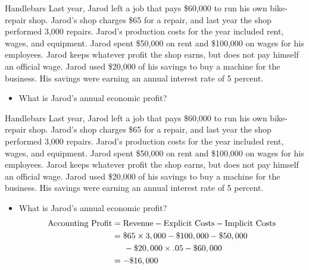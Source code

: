 \documentclass{beamer}
\begin{document}
\begin{frame}[t]{Handlebars}
    Last year, Jarod left a job that pays \$60,000 to run his own bike-repair shop. Jarod’s shop charges \$65 for a repair, and last year the shop performed 3,000 repairs. Jarod’s production costs for the year included rent, wages, and equipment. Jarod spent \$50,000 on rent and \$100,000 on wages for his employees. Jarod keeps whatever profit the shop earns, but does not pay himself an official wage. Jarod used \$20,000 of his savings to buy a machine for the business. His savings were earning an annual interest rate of 5 percent.
    \begin{itemize}
        \item What is Jarod's annual economic profit?
    \end{itemize}
\end{frame}

\begin{frame}[t]{Handlebars}
    Last year, Jarod left a job that pays \$60,000 to run his own bike-repair shop. Jarod’s shop charges \$65 for a repair, and last year the shop performed 3,000 repairs. Jarod’s production costs for the year included rent, wages, and equipment. Jarod spent \$50,000 on rent and \$100,000 on wages for his employees. Jarod keeps whatever profit the shop earns, but does not pay himself an official wage. Jarod used \$20,000 of his savings to buy a machine for the business. His savings were earning an annual interest rate of 5 percent.
    \begin{itemize}
        \item What is Jarod's annual economic profit?
        \[\begin{split}
            \text{Accounting Profit} &= \text{Revenue} - \text{Explicit Costs} - \text{Implicit Costs}\\
            &=\$65 \times 3,000 - \$100,000 - \$50,000 \\
            &\hspace{5 mm}-\$20,000 \times .05 - \$60,000\\
            &= -\$16,000
        \end{split}\]
    \end{itemize}
\end{frame}
\end{document}
